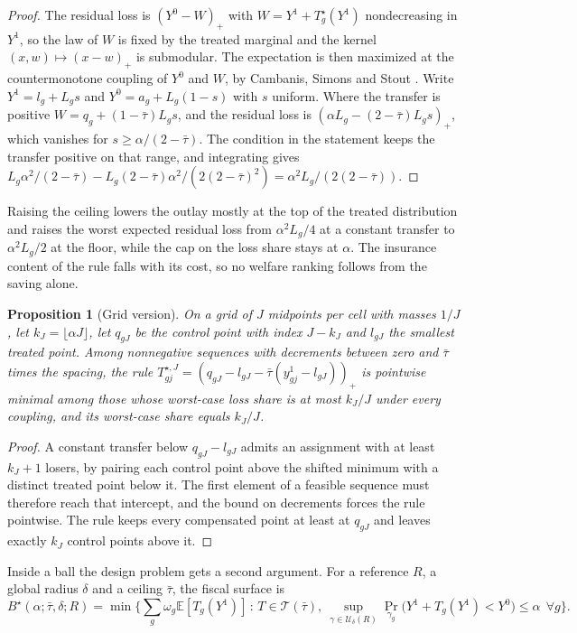 \documentclass[11pt,a4paper]{article}
\theoremstyle{notesplain}
\newtheorem{proposition}[theorem]{Proposition}
\theoremstyle{notesupright}
\numberwithin{equation}{section}
\newcommand{\E}{\mathbb{E}}
\begin{document}
\begin{proof}
The residual loss is $(Y^0-W)_+$ with $W=Y^1+T^\star_g(Y^1)$ nondecreasing in $Y^1$, so the law of $W$ is fixed by the treated marginal and the kernel $(x,w)\mapsto(x-w)_+$ is submodular. The expectation is then maximized at the countermonotone coupling of $Y^0$ and $W$, by Cambanis, Simons and Stout \cite{cambanis}. Write $Y^1=l_g+L_gs$ and $Y^0=a_g+L_g(1-s)$ with $s$ uniform. Where the transfer is positive $W=q_g+(1-\bar\tau)L_gs$, and the residual loss is $(\alpha L_g-(2-\bar\tau)L_gs)_+$, which vanishes for $s\ge\alpha/(2-\bar\tau)$. The condition in the statement keeps the transfer positive on that range, and integrating gives $L_g\alpha^2/(2-\bar\tau)-L_g(2-\bar\tau)\alpha^2/(2(2-\bar\tau)^2)=\alpha^2L_g/(2(2-\bar\tau))$.
\end{proof}

Raising the ceiling lowers the outlay mostly at the top of the treated distribution and raises the worst expected residual loss from $\alpha^2L_g/4$ at a constant transfer to $\alpha^2L_g/2$ at the floor, while the cap on the loss share stays at $\alpha$. The insurance content of the rule falls with its cost, so no welfare ranking follows from the saving alone.

\begin{proposition}[Grid version]
\label{prop:grid}
On a grid of $J$ midpoints per cell with masses $1/J$, let $k_J=\lfloor\alpha J\rfloor$, let $q_{gJ}$ be the control point with index $J-k_J$ and $l_{gJ}$ the smallest treated point. Among nonnegative sequences with decrements between zero and $\bar\tau$ times the spacing, the rule $T^{\star,J}_{gj}=(q_{gJ}-l_{gJ}-\bar\tau(y^1_{gj}-l_{gJ}))_+$ is pointwise minimal among those whose worst-case loss share is at most $k_J/J$ under every coupling, and its worst-case share equals $k_J/J$.
\end{proposition}

\begin{proof}
A constant transfer below $q_{gJ}-l_{gJ}$ admits an assignment with at least $k_J+1$ losers, by pairing each control point above the shifted minimum with a distinct treated point below it. The first element of a feasible sequence must therefore reach that intercept, and the bound on decrements forces the rule pointwise. The rule keeps every compensated point at least at $q_{gJ}$ and leaves exactly $k_J$ control points above it.
\end{proof}

Inside a ball the design problem gets a second argument. For a reference $R$, a global radius $\delta$ and a ceiling $\bar\tau$, the fiscal surface is
\begin{equation}
B^\star(\alpha;\bar\tau,\delta;R)=\min\Big\{\sum_g\omega_g\E[T_g(Y^1)]\,:\,T\in\mathcal T(\bar\tau),\ \sup_{\gamma\in\mathcal U_\delta(R)}\Pr_{\gamma_g}\big(Y^1+T_g(Y^1)<Y^0\big)\le\alpha\ \ \forall g\Big\}.
\label{eq:surface}
\end{equation}
\end{document}
